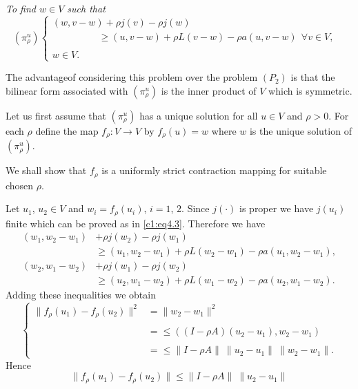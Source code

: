 \textit{To find $w \in V$ such that}
\begin{equation}
(\pi^u_\rho)
\begin{cases}
(w,v-w) + \rho j(v) - \rho j(w) \\
 \hspace{2cm}\geq (u, v-w) +\rho L(v -w) - \rho
  a(u, v-w) ~~ \forall v \in V, \\ 
&\\
w \in V.
\end{cases}\tag{4.5}\label{c1:eq4.5}
\end{equation}

The advantage\pageoriginale of considering this problem over the problem $(P_2)$ is
that the bilinear form associated with $(\pi^u_\rho)$ is the inner
product of $V$ which is symmetric.  

Let us first assume that $(\pi^u_\rho)$ has a unique solution for all
$u \in V$ and $\rho > 0$. For each $\rho$ define the map $f_\rho
: V \to V$ by $f_\rho(u) = w$ where $w$ is the unique solution of
$(\pi^u_\rho)$. 

We shall show that $f_\rho$ is a uniformly strict contraction mapping
for suitable chosen $\rho$.  

Let $u_1$, $u_2 \in V$ and $w_i = f_\rho(u_i)$, $i=1$, $2$. Since
$j(\cdot)$ is proper we have $j(u_i)$ finite which can be proved as in
\eqref{c1:eq4.3}. Therefore we have  
\begin{align*}
(w_1,w_2 - w_1) & + \rho j(w_2)-\rho j(w_1)\\ 
 &\geq (u_1, w_2 - w_1)+\rho
  L(w_2-w_1 ) - \rho a(u_1, w_2 - w_1), \tag{4.6}\label{c1:eq4.6}\\ 
(w_2, w_1 - w_2) & + \rho j(w_1) - \rho j(w_2)\\ 
  & \geq (u_2, w_1-w_2)+\rho
  L(w_1 - w_2 ) -\rho a(u_2,w_1-w_2). \tag{4.7}\label{c1:eq4.7} 
\end{align*}
Adding these inequalities we obtain 
\begin{equation*}
\left\{\begin{aligned}
\parallel f_\rho (u_1) -f_\rho (u_2) \parallel^2 & = \parallel w_2-w_1
\parallel^2 \\ 
&\\
& = \leq ((I -\rho A) (u_2-u_1), w_2 - w_1)\\ 
&\\
& = \leq \parallel I- \rho A \parallel ~\parallel u_2-u_1 \parallel
~\parallel w_2-w_1 \parallel. 
\end{aligned}\right.\tag{4.8}\label{c1:eq4.8}
\end{equation*}
Hence 
$$
\parallel f_\rho (u_1) -f_\rho (u_2) \parallel \leq \parallel I- \rho
A\parallel ~\parallel u_2-u_1\parallel 
$$

